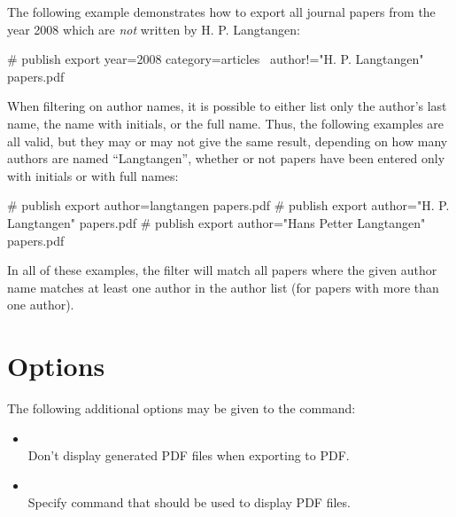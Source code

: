 The following example demonstrates how to export all journal papers
from the year 2008 which are \emph{not} written by H. P. Langtangen:
\begin{code}
# publish export year=2008 category=articles \
  author!="H. P. Langtangen" papers.pdf
\end{code} 

When filtering on author names, it is possible to either list only the
author's last name, the name with initials, or the full name. Thus,
the following examples are all valid, but they may or may not give the
same result, depending on how many authors are named ``Langtangen'',
whether or not papers have been entered only with initials or with
full names:
\begin{code}
# publish export author=langtangen papers.pdf
# publish export author="H. P. Langtangen" papers.pdf
# publish export author="Hans Petter Langtangen" papers.pdf
\end{code}
In all of these examples, the filter will match all papers where the
given author name matches at least one author in the author list (for
papers with more than one author).

\section{Options}

The following additional options may be given to the  command:
\begin{itemize}
\item
   \\

  Don't display generated PDF files when exporting to PDF.
\item
   \\

  Specify command that should be used to display PDF files.
\end{itemize}
